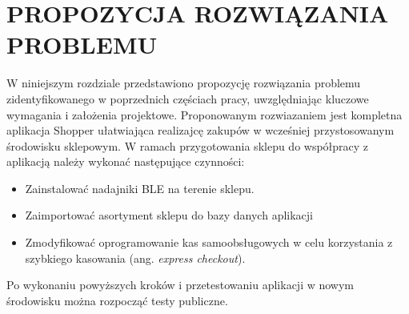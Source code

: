 \chapter{PROPOZYCJA ROZWIĄZANIA PROBLEMU}
\label{chapter:propozycja_rozwiazania_problemu}
W niniejszym rozdziale przedstawiono propozycję rozwiązania problemu zidentyfikowanego w poprzednich częściach pracy, uwzględniając kluczowe wymagania i założenia projektowe. Proponowanym rozwiazaniem jest kompletna aplikacja Shopper ułatwiająca realizajcę zakupów w wcześniej przystosowanym środowisku sklepowym. W ramach przygotowania sklepu do współpracy z aplikacją należy wykonać następujące czynności:
\begin{itemize}
    \item Zainstalować nadajniki BLE na terenie sklepu.
    \item Zaimportować asortyment sklepu do bazy danych aplikacji
    \item Zmodyfikować oprogramowanie kas samoobsługowych w celu korzystania z szybkiego kasowania (ang. \textit{express checkout}).
\end{itemize}

Po wykonaniu powyższych kroków i przetestowaniu aplikacji w nowym środowisku można rozpocząć testy publiczne.
